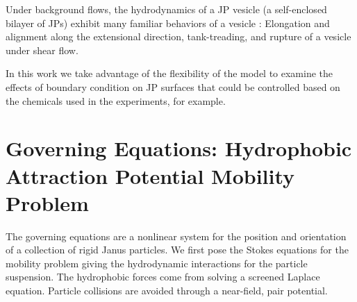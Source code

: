 \documentclass[prb,preprint,showpacs,preprintnumbers,amsmath,amssymb,longbibliography]{revtex4-1}
\begin{document}
Under background flows, the hydrodynamics of a JP vesicle (a
self-enclosed bilayer of JPs) exhibit many familiar behaviors of a
vesicle \cite{Fu2022_JFM}: 
Elongation and alignment along the extensional direction, tank-treading, and rupture of a vesicle under shear flow.

In this work we take advantage of the flexibility of the model to examine the effects of boundary condition on JP surfaces that could be controlled based on the chemicals used in the experiments, for example.

\section{Governing Equations: Hydrophobic Attraction Potential Mobility Problem} 
The governing equations are a nonlinear system for the position and
orientation of a collection of rigid Janus particles. We first pose the
Stokes equations for the mobility problem giving the hydrodynamic
interactions for the particle suspension. The hydrophobic forces come
from solving a screened Laplace equation. Particle collisions are
avoided through a near-field, pair potential.
\end{document}
